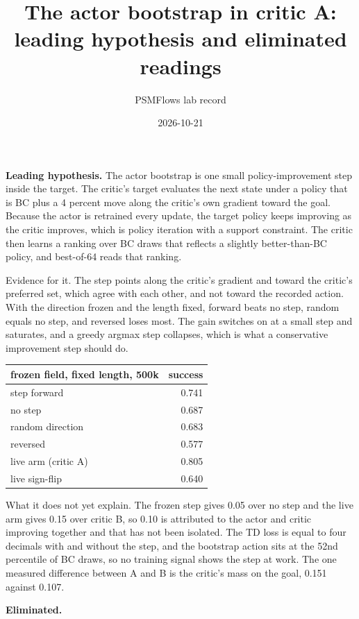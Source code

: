 \documentclass[11pt]{article}
\title{The actor bootstrap in critic A: leading hypothesis and eliminated readings}
\author{PSMFlows lab record}
\date{2026-10-21}
\begin{document}
\maketitle

\textbf{Leading hypothesis.} The actor bootstrap is one small policy-improvement step inside the target. The critic's target evaluates the next state under a policy that is BC plus a 4 percent move along the critic's own gradient toward the goal. Because the actor is retrained every update, the target policy keeps improving as the critic improves, which is policy iteration with a support constraint. The critic then learns a ranking over BC draws that reflects a slightly better-than-BC policy, and best-of-64 reads that ranking.

Evidence for it. The step points along the critic's gradient and toward the critic's preferred set, which agree with each other, and not toward the recorded action. With the direction frozen and the length fixed, forward beats no step, random equals no step, and reversed loses most. The gain switches on at a small step and saturates, and a greedy argmax step collapses, which is what a conservative improvement step should do.

\begin{center}
\begin{tabular}{l r}
\hline
frozen field, fixed length, 500k & success \\
\hline
step forward & 0.741 \\
no step & 0.687 \\
random direction & 0.683 \\
reversed & 0.577 \\
live arm (critic A) & 0.805 \\
live sign-flip & 0.640 \\
\hline
\end{tabular}
\end{center}

What it does not yet explain. The frozen step gives 0.05 over no step and the live arm gives 0.15 over critic B, so 0.10 is attributed to the actor and critic improving together and that has not been isolated. The TD loss is equal to four decimals with and without the step, and the bootstrap action sits at the 52nd percentile of BC draws, so no training signal shows the step at work. The one measured difference between A and B is the critic's mass on the goal, 0.151 against 0.107.

\textbf{Eliminated.}
\end{document}
